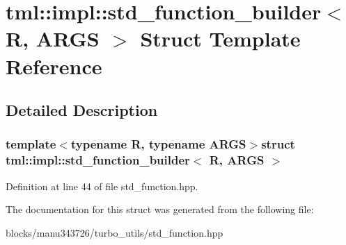 \hypertarget{structtml_1_1impl_1_1std__function__builder}{\section{tml\+:\+:impl\+:\+:std\+\_\+function\+\_\+builder$<$ R, A\+R\+G\+S $>$ Struct Template Reference}
\label{structtml_1_1impl_1_1std__function__builder}
}


\subsection{Detailed Description}
\subsubsection*{template$<$typename R, typename A\+R\+G\+S$>$struct tml\+::impl\+::std\+\_\+function\+\_\+builder$<$ R, A\+R\+G\+S $>$}



Definition at line 44 of file std\+\_\+function.\+hpp.



The documentation for this struct was generated from the following file\+:\begin{DoxyCompactItemize}
\item 
blocks/manu343726/turbo\+\_\+utils/std\+\_\+function.\+hpp\end{DoxyCompactItemize}
